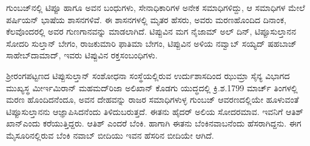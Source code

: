 ಗುಂಬಜ್​ನಲ್ಲಿ ಟಿಪ್ಪೂ ಹಾಗೂ ಅವನ ಬಂಧುಗಳು, ಸೇನಾಧಿಕಾರಿಗಳ ಅನೇಕ ಸಮಾಧಿಗಳಿದ್ದು, ಆ ಸಮಾಧಿಗಳ ಮೇಲೆ ಪರ್ಷಿಯನ್​ ಭಾಷೆಯ ಶಾಸನಗಳಿವೆ. ಈ ಶಾಸನಗಳಲ್ಲಿ ಮೃತರ ಹೆಸರು, ಅವರು ಮರಣಹೊಂದಿದ ದಿನಾಂಕ, ಕೆಲವೊಂದರಲ್ಲಿ ಅವರ ಗುಣಗಾನವನ್ನು ಮಾಡಲಾಗಿದೆ. ಟಿಪ್ಪುವಿನ ಮಗ ನೈಜಾಮ್ ಅಲ್​ ದಿನ್​, ಟಿಪ್ಪೂಸುಲ್ತಾನನ ಸೋದರಿ ಸುಲ್ತಾನ್​ ಬೇಗಂ, ರಾಜಕುಮಾರಿ ಫಾತಿಮಾ ಬೇಗಂ, ಟಿಪ್ಪುವಿನ ಅಳಿಯ ನವ್ವಾಬ್​ ಸಯ್ಯದ್​ ಷಹಬಾಜ್​ ಸಾಹೇಬ್​ ದಾಮಾದ್​, ಇವರು ಟಿಪ್ಪುವಿನ ರಕ್ತಸಂಬಂಧಿಗಳು.

ಶ‍್ರೀರಂಗಪಟ್ಟಣದ ಟಿಪ್ಪುಸುಲ್ತಾನ್​ ಸಂಶೋಧನಾ ಸಂಸ್ಥೆಯಲ್ಲಿರುವ ಉರ್ದುಶಾಸದಿಂದ ಝುಮ್ರಾ ಸೈನ್ಯ ವಿಭಾಗದ ಮುಖ್ಯಸ್ಥ ಮೀರ್ಇಮಿರಾನ್​ ಮಹಮದ್​ರಿಜಾ ಅಲಿಖಾನ್​ ಕೊಡಗು ಯುದ್ಧದಲ್ಲಿ ಕ್ರಿ.ಶ.1799 ಮಾರ್ಚ್ ತಿಂಗಳಲ್ಲಿ ಮರಣ ಹೊಂದಿದನೆಂದೂ, ಅವನ ದೇಹವನ್ನು ರಾಜರ ಸಮಾಧಿಗಳುಳ್ಳ ಗುಂಬಜ್​ ಆವರಣದಲ್ಲಿಯೇ ಹೂಳುವಂತೆ ಟಿಪ್ಪೂಸುಲ್ತಾನನು ಆಜ್ಞಾಪಿಸಿದನೆಂದು ತಿಳಿದುಬರುತ್ತದೆ. ಈತನು ಹೈದರ್​ ಅಲಿಯ ಸೋದರಮಾವ. ಇವನಿಗೆ ಆತಿಶ್​ಖಾನ್​ ಎಂದು ಕರೆಯುತ್ತಿದ್ದರು. ಆತಿಶ್​ ಎಂದರೆ ಬೆಂಕಿ. ಹಾಗಾಗಿ ಈತನು ಬೆಂಕಿನವಾಬನೆಂದು ಹೆಸರಾಗಿದ್ದನು. ಈಗ ಮೈಸೂರಿನಲ್ಲಿರುವ ಬೆಂಕಿ ನವಾಬ್​ ಬೀದಿಯು ಇವನ ಹೆಸರಿನ ಬೀದಿಯೇ ಆಗಿದೆ. 

